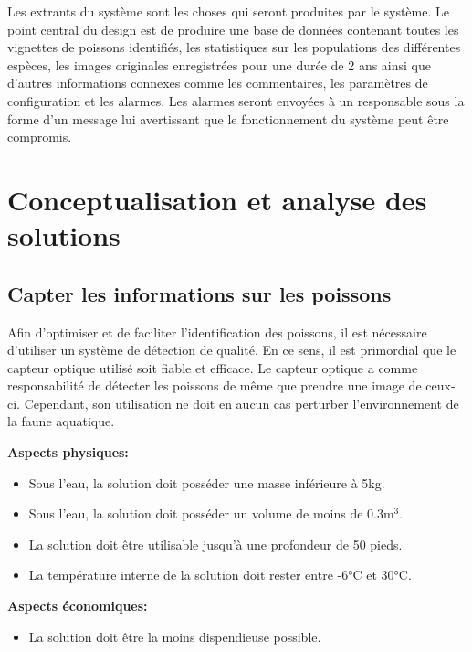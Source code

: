 Les extrants du système sont les choses qui seront produites par le système. Le point central du design est de produire une base de données contenant toutes les vignettes de poissons identifiés, les statistiques sur les populations des différentes espèces, les images originales enregistrées pour une durée de 2 ans ainsi que d'autres informations connexes comme les commentaires, les paramètres de configuration et les alarmes. Les alarmes seront envoyées à un responsable sous la forme d'un message lui avertissant que le fonctionnement du système peut être compromis.

\pagebreak

\section{Conceptualisation et analyse des solutions}

\subsection{Capter les informations sur les poissons}

Afin d'optimiser et de faciliter l'identification des poissons, il est nécessaire d'utiliser un système de détection de qualité. En ce sens, il est primordial que le capteur optique utilisé soit fiable et efficace. Le capteur optique a comme responsabilité de détecter les poissons de même que prendre une image de ceux-ci. Cependant, son utilisation ne doit en aucun cas perturber l'environnement de la faune aquatique.


\textbf{Aspects physiques:}
\begin{itemize}[label = {--}]
    \item Sous l'eau, la solution doit posséder une masse inférieure à 5kg.
    \item Sous l'eau, la solution doit posséder un volume de moins de 0.3m$^3$.
    \item La solution doit être utilisable jusqu'à une profondeur de 50 pieds.
    \item La température interne de la solution doit rester entre -6°C et 30°C.
\end{itemize}

\textbf{Aspects économiques:}
\begin{itemize}[label = {--}]
    \item La solution doit être la moins dispendieuse possible.
\end{itemize}


